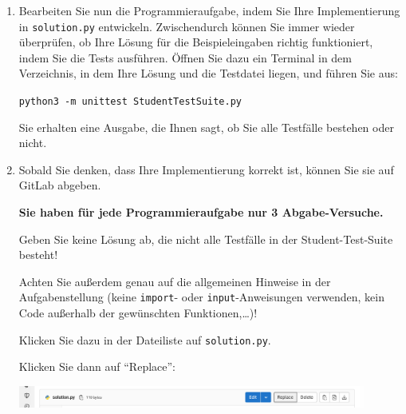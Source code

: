 \documentclass{scrartcl}
\begin{document}
\begin{enumerate}
%		
		
		\vfill
		
		\item Bearbeiten Sie nun die Programmieraufgabe, indem Sie Ihre Implementierung in \texttt{solution.py} entwickeln. Zwischendurch können Sie immer wieder überprüfen, ob Ihre Lösung für die Beispieleingaben richtig funktioniert, indem Sie die Tests ausführen. Öffnen Sie dazu ein Terminal in dem Verzeichnis, in dem Ihre Lösung und die Testdatei liegen, und führen Sie aus:
		
		\vfill
		
		\texttt{python3 -m unittest StudentTestSuite.py}
		
		\vfill
		
		Sie erhalten eine Ausgabe, die Ihnen sagt, ob Sie alle Testfälle bestehen oder nicht.
		
		\vfill
		
		\item Sobald Sie denken, dass Ihre Implementierung korrekt ist, können Sie sie auf GitLab abgeben.
		
		\vfill
		
		\begin{tcolorbox}[title=\faExclamationCircle\space Achtung,colbacktitle=red!75,colframe=red!75]
			\bfseries Sie haben für jede Programmieraufgabe nur 3 Abgabe-Versuche.
			
			Geben Sie keine Lösung ab, die nicht alle Testfälle in der Student-Test-Suite besteht!
			
			Achten Sie außerdem genau auf die allgemeinen Hinweise in der Aufgabenstellung (keine \texttt{import}- oder \texttt{input}-Anweisungen verwenden, kein Code außerhalb der gewünschten Funktionen,\ldots)!
		\end{tcolorbox}
	
		\vfill
	
		Klicken Sie dazu in der Dateiliste auf \texttt{solution.py}. 
		
		Klicken Sie dann auf \enquote{Replace}:
		
		\vfill
		
		\includegraphics[width=0.9\textwidth]{img/screenshot-replace-button.png}
		

\end{enumerate}
\end{document}
